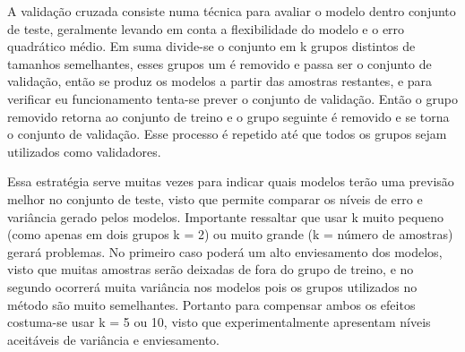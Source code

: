 A validação cruzada consiste numa técnica para avaliar o modelo dentro conjunto de teste, geralmente levando em conta a flexibilidade do modelo e o erro quadrático médio. Em suma divide-se o conjunto em k grupos distintos de tamanhos semelhantes, esses grupos um é removido e passa ser o conjunto de validação, então se produz os modelos a partir das amostras restantes, e para verificar  eu funcionamento tenta-se prever o conjunto de validação. Então o grupo removido retorna ao conjunto de treino e o grupo seguinte é removido e se torna o conjunto de validação. Esse processo é repetido até que todos os grupos sejam utilizados como validadores.

Essa estratégia serve muitas vezes para indicar quais modelos terão uma previsão melhor no conjunto de teste, visto que permite comparar os níveis de erro e variância gerado pelos modelos. Importante ressaltar que usar k muito pequeno (como apenas em dois grupos k = 2) ou muito grande (k = número de amostras) gerará problemas. No primeiro caso poderá um alto enviesamento dos modelos, visto que muitas amostras serão deixadas de fora do grupo de treino, e no segundo ocorrerá muita variância nos modelos pois os grupos utilizados no método são muito semelhantes. Portanto para compensar ambos os efeitos costuma-se usar k = 5 ou 10, visto que experimentalmente apresentam níveis aceitáveis de variância e enviesamento.